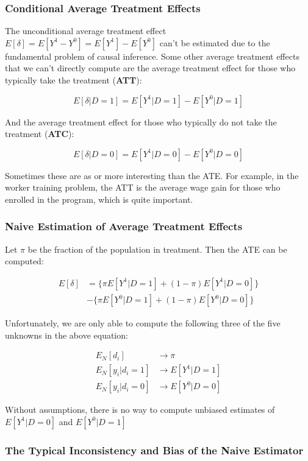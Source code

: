 \documentclass[12 pt, leqno]{article}
\begin{document}
\subsubsection{Conditional Average Treatment Effects}

The unconditional average treatment effect $E[\delta] = E[Y^1 - Y^0] = E[Y^1] - E[Y^0]$ can't be estimated due to the fundamental problem of causal inference. Some other average treatment effects that we can't directly compute are the average treatment effect for those who typically take the treatment (\textbf{ATT}):

$$E[\delta|D = 1] = E[Y^1|D=1] - E[Y^0|D=1]$$

And the average treatment effect for those who typically do not take the treatment (\textbf{ATC}):

$$E[\delta|D = 0] = E[Y^1|D=0] - E[Y^0|D=0]$$

Sometimes these are as or more interesting than the ATE. For example, in the worker training problem, the ATT is the average wage gain for those who enrolled in the program, which is quite important. 

\subsubsection{Naive Estimation of Average Treatment Effects}

Let $\pi$ be the fraction of the population in treatment. Then the ATE can be computed:

\begin{align*}
E[\delta] &= \{\pi E[Y^1|D=1] + (1-\pi) E[Y^1|D=0] \} \\
&- \{\pi E[Y^0|D=1] + (1-\pi) E[Y^0|D=0] \}
\end{align*}

Unfortunately, we are only able to compute the following three of the five unknowns in the above equation:

\begin{align*}
E_N[d_i] &\rightarrow \pi \\
E_N[y_i|d_i = 1] &\rightarrow E[Y^1|D=1] \\
E_N[y_i|d_i = 0] &\rightarrow E[Y^0|D=0] 
\end{align*}

Without assumptions, there is no way to compute unbiased estimates of $E[Y^1|D = 0]$ and $E[Y^0|D=1]$

\subsubsection{The Typical Inconsistency and Bias of the Naive Estimator}
\end{document}
